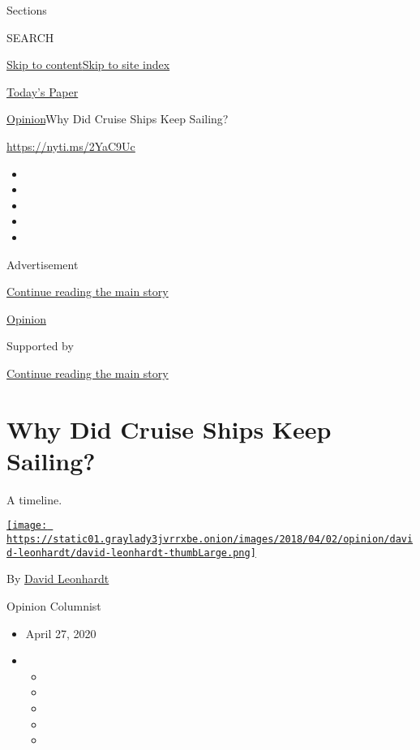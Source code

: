 Sections

SEARCH

\protect\hyperlink{site-content}{Skip to
content}\protect\hyperlink{site-index}{Skip to site index}

\href{https://myaccount.nytimes3xbfgragh.onion/auth/login?response_type=cookie\&client_id=vi}{}

\href{https://www.nytimes3xbfgragh.onion/section/todayspaper}{Today's
Paper}

\href{/section/opinion}{Opinion}\textbar{}Why Did Cruise Ships Keep
Sailing?

\url{https://nyti.ms/2YaC9Uc}

\begin{itemize}
\item
\item
\item
\item
\item
\end{itemize}

Advertisement

\protect\hyperlink{after-top}{Continue reading the main story}

\href{/section/opinion}{Opinion}

Supported by

\protect\hyperlink{after-sponsor}{Continue reading the main story}

\hypertarget{why-did-cruise-ships-keep-sailing}{%
\section{Why Did Cruise Ships Keep
Sailing?}\label{why-did-cruise-ships-keep-sailing}}

A timeline.

\href{https://www.nytimes3xbfgragh.onion/by/david-leonhardt}{\texttt{[image: https://static01.graylady3jvrrxbe.onion/images/2018/04/02/opinion/david-leonhardt/david-leonhardt-thumbLarge.png]}}

By \href{https://www.nytimes3xbfgragh.onion/by/david-leonhardt}{David
Leonhardt}

Opinion Columnist

\begin{itemize}
\item
  April 27, 2020
\item
  \begin{itemize}
  \item
  \item
  \item
  \item
  \item
  \end{itemize}
\end{itemize}

